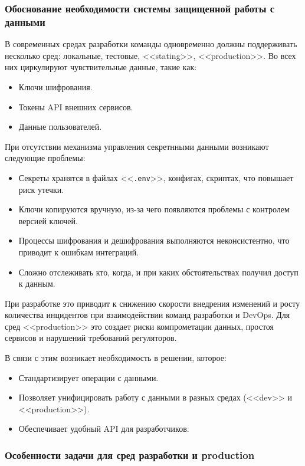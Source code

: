 \documentclass[14pt, a4paper]{extarticle}
\begin{document}
	\subsubsection{Обоснование необходимости системы защищенной работы с данными}
	
	В современных средах разработки команды одновременно должны поддерживать несколько сред: локальные, тестовые, <<stating>>, <<production>>. Во всех них циркулируют чувствительные данные, такие как:
	
	\begin{itemize}
	\item Ключи шифрования.
	\item Токены API внешних сервисов.
	\item Данные пользователей.
	\end{itemize}
	
	При отсутствии механизма управления секретнными данными возникают следующие проблемы:
	
	\begin{itemize}
	\item Секреты хранятся в файлах <<\texttt{.env}>>, конфигах, скриптах, что повышает риск утечки.
	\item Ключи копируются вручную, из-за чего появляются проблемы с контролем версией ключей.
	\item Процессы шифрования и дешифрования выполняются неконсистентно, что приводит к ошибкам интеграций.
	\item Сложно отслеживать кто, когда, и при каких обстоятельствах получил доступ к данным.
	\end{itemize}
	
	При разработке это приводит к снижению скорости внедрения изменений и росту количества инцидентов при взаимодействии команд разработки и DevOps. Для сред <<production>> это создает риски компрометации данных, простоя сервисов и нарушений требований регуляторов.
	
	В связи с этим возникает необходимость в решении, которое:
	
	\begin{itemize}
	\item Стандартизирует операции с данными.
	\item Позволяет унифицировать работу с данными в разных средах (<<dev>> и <<production>>).
	\item Обеспечивает удобный API для разработчиков.
	\end{itemize}
	
	\subsubsection{Особенности задачи для сред разработки и production}
	
\end{document}
